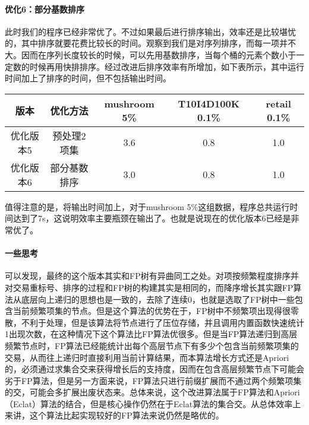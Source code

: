 \documentclass[a4paper,9pt]{article}
\begin{document}
\paragraph{优化6：部分基数排序} 此时我们的程序已经非常优了。不过如果最后进行排序输出，效率还是比较堪忧的，其中排序就要花费比较长的时间。观察到我们是对序列排序，而每一项并不大。因而在序列长度较长的时候，可以先用基数排序，当每个桶的元素个数小于一定数的时候再用快排排序。经过改进后排序效率有所增加，如下表所示，其中运行时间加上了排序的时间，但不包括输出时间。
\begin{center}
	\begin{tabular}{ccccc}
		版本&优化方法&mushroom 5\%&T10I4D100K 0.1\%&retail 0.1\%\\\hline
		优化版本5&预处理2项集&3.6&0.8&1.0\\
		优化版本6&部分基数排序&3.0&0.8&1.0
	\end{tabular}
\end{center}
值得注意的是，将输出时间加上，对于mushroom 5\%这组数据，程序总共运行时间达到了7s，这说明效率主要瓶颈在输出了。也就是说现在的优化版本6已经是非常优了。

\paragraph{一些思考} 可以发现，最终的这个版本其实和FP树有异曲同工之处。对项按频繁程度排序并对交易重标号、排序的过程和FP树的构建其实是相同的，而降序增长其实跟FP算法从底层向上递归的思想也是一致的，去除了连续0，也就是选取了FP树中一些包含当前频繁项集的节点。但是这个算法的优势在于，FP树中不频繁项出现得很零散，不利于处理，但是该算法将节点进行了压位存储，并且调用内置函数快速统计1出现次数，在这种情况下这个算法比FP算法优很多。但是当FP算法递归到高层频繁节点时，FP算法已经能统计出每个高层节点下有多少个包含当前频繁项集的交易，从而往上递归时直接利用当前计算结果，而本算法增长方式还是Apriori的，必须通过求集合交来获得增长后的支持度，因而在包含高层频繁节点下可能会劣于FP算法，但是另一方面来说，FP算法只进行前缀扩展而不通过两个频繁项集的交，可能会多扩展出废状态来。总体来说，这个改进算法属于FP算法和Apriori（Eclat）算法的结合，但是核心操作仍然在于Eclat算法的集合交。从总体效率上来讲，这个算法比起实现较好的FP算法来说仍然是略优的。
\end{document}
